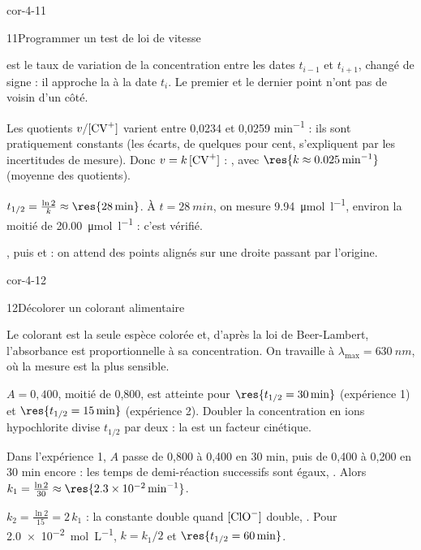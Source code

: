 \begin{blocLivre}{cor-4-11}
\begin{corrige}{11}{Programmer un test de loi de vitesse}
\begin{questions}
\item {} est le taux de variation de la concentration entre les dates $t_{i-1}$ et $t_{i+1}$, changé de signe :
il approche la  à la date $t_i$. Le premier et le dernier point n'ont pas
de voisin d'un côté.
\item Les quotients $v/[\ce{CV+}]$ varient entre 0,0234 et 0,0259 \unit{min^{-1}} : ils sont pratiquement constants
(les écarts, de quelques pour cent, s'expliquent par les incertitudes de mesure). Donc $v=k\,[\ce{CV+}]$ :
, avec $\res{k\approx\qty{0,025}{min^{-1}}}$ (moyenne des quotients).
\item $t_{1/2}=\frac{\ln2}{k}\approx\res{\qty{28}{min}}$. À $t=\qty{28}{min}$, on mesure \qty{9,94}{\micro\mole\per\litre},
environ la moitié de \qty{20,00}{\micro\mole\per\litre} : c'est vérifié.
\item {}, puis  et  : on attend des
points alignés sur une droite passant par l'origine.
\end{questions}
\end{corrige}
\end{blocLivre}
\begin{blocLivre}{cor-4-12}
\begin{corrige}{12}{Décolorer un colorant alimentaire}
\begin{questions}
\item Le colorant est la seule espèce colorée et, d'après la loi de Beer-Lambert, l'absorbance est proportionnelle à sa
concentration. On travaille à $\lambda_{\max}=\qty{630}{nm}$, où la mesure est la plus sensible.
\item $A=0{,}400$, moitié de 0,800, est atteinte pour $\res{t_{1/2}=\qty{30}{min}}$ (expérience 1) et
$\res{t_{1/2}=\qty{15}{min}}$ (expérience 2). Doubler la concentration en ions hypochlorite divise $t_{1/2}$ par deux :
la  est un facteur cinétique.
\item Dans l'expérience 1, $A$ passe de 0,800 à 0,400 en 30 min, puis de 0,400 à 0,200 en 30 min encore : les temps
de demi-réaction successifs sont égaux, . Alors
$k_1=\frac{\ln2}{30}\approx\res{\qty{2,3e-2}{min^{-1}}}$.
\item $k_2=\frac{\ln2}{15}=2\,k_1$ : la constante double quand $[\ce{ClO-}]$ double, . Pour
\qty{2,0e-2}{mol.L^{-1}}, $k=k_1/2$ et $\res{t_{1/2}=\qty{60}{min}}$.
\end{questions}
\end{corrige}
\end{blocLivre}

